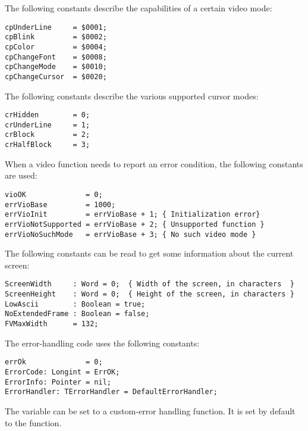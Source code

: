 The following constants describe the capabilities of a certain video mode:
\begin{verbatim}
cpUnderLine     = $0001;
cpBlink         = $0002;
cpColor         = $0004;
cpChangeFont    = $0008;
cpChangeMode    = $0010;
cpChangeCursor  = $0020;
\end{verbatim}
The following constants describe the various supported cursor modes:
\begin{verbatim}
crHidden        = 0;
crUnderLine     = 1;
crBlock         = 2;
crHalfBlock     = 3;
\end{verbatim}
When a video function needs to report an error condition, the following
constants are used:
\begin{verbatim}
vioOK              = 0;
errVioBase         = 1000;
errVioInit         = errVioBase + 1; { Initialization error}
errVioNotSupported = errVioBase + 2; { Unsupported function }
errVioNoSuchMode   = errVioBase + 3; { No such video mode }
\end{verbatim}
The following constants can be read to get some information about the
current screen:
\begin{verbatim}
ScreenWidth     : Word = 0;  { Width of the screen, in characters  }
ScreenHeight    : Word = 0;  { Height of the screen, in characters }
LowAscii        : Boolean = true;
NoExtendedFrame : Boolean = false;
FVMaxWidth      = 132; 
\end{verbatim}
The error-handling code uses the following constants:
\begin{verbatim}
errOk              = 0;
ErrorCode: Longint = ErrOK;
ErrorInfo: Pointer = nil;
ErrorHandler: TErrorHandler = DefaultErrorHandler;
\end{verbatim}
The  variable can be set to a custom-error handling
function. It is set by default to the  function.

